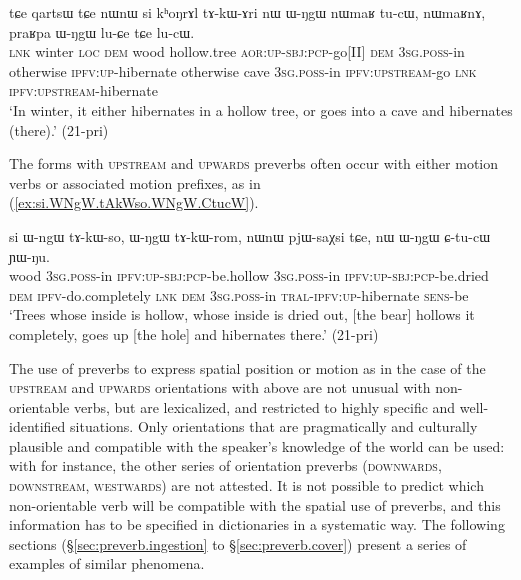 \begin{exe}
\ex \label{ex:praRpa.WNgW.lucW}
\gll tɕe qartsɯ tɕe nɯnɯ si kʰoŋrɤl tɤ-kɯ-ɤri nɯ ɯ-ŋgɯ nɯmaʁ tu-cɯ, 
nɯmaʁnɤ, praʁpa ɯ-ŋgɯ lu-ɕe tɕe lu-cɯ. \\
\textsc{lnk} winter \textsc{loc} \textsc{dem} wood hollow.tree \textsc{aor}:\textsc{up}-\textsc{sbj}:\textsc{pcp}-go[II] \textsc{dem} \textsc{3sg}.\textsc{poss}-in otherwise \textsc{ipfv}:\textsc{up}-hibernate otherwise cave \textsc{3sg}.\textsc{poss}-in \textsc{ipfv}:\textsc{upstream}-go \textsc{lnk} \textsc{ipfv}:\textsc{upstream}-hibernate \\
\glt `In winter, it either hibernates in a hollow tree, or goes into a cave and hibernates (there).' (21-pri)
\end{exe}


The forms with \textsc{upstream} and \textsc{upwards} preverbs often occur with either motion verbs or associated motion prefixes, as in (\ref{ex:si.WNgW.tAkWso.WNgW.CtucW}).

\begin{exe}
\ex \label{ex:si.WNgW.tAkWso.WNgW.CtucW}
\gll  si ɯ-ngɯ tɤ-kɯ-so, ɯ-ŋgɯ tɤ-kɯ-rom, nɯnɯ pjɯ-saχsi tɕe, nɯ ɯ-ŋgɯ ɕ-tu-cɯ ɲɯ-ŋu.\\
wood \textsc{3sg}.\textsc{poss}-in \textsc{ipfv}:\textsc{up}-\textsc{sbj}:\textsc{pcp}-be.hollow \textsc{3sg}.\textsc{poss}-in \textsc{ipfv}:\textsc{up}-\textsc{sbj}:\textsc{pcp}-be.dried \textsc{dem} \textsc{ipfv}-do.completely \textsc{lnk} \textsc{dem} \textsc{3sg}.\textsc{poss}-in \textsc{tral}-\textsc{ipfv}:\textsc{up}-hibernate \textsc{sens}-be \\
\glt `Trees whose inside is hollow, whose inside is dried out, [the bear] hollows it completely, goes up [the hole] and hibernates there.' (21-pri) 
\end{exe}

The use of preverbs to express spatial position or motion as in the case of the \textsc{upstream} and \textsc{upwards} orientations with  above are not unusual with non-orientable verbs, but are lexicalized, and restricted to highly specific and well-identified situations. Only orientations that are pragmatically and culturally plausible and compatible with the speaker's knowledge of the world can be used: with  for instance, the other series of  orientation preverbs (\textsc{downwards}, \textsc{downstream}, \textsc{westwards}) are not attested. It is not possible to predict which non-orientable verb will be compatible with the spatial use of preverbs, and this information has to be specified in dictionaries in a systematic way. The following sections (§\ref{sec:preverb.ingestion} to §\ref{sec:preverb.cover}) present a series of examples of similar phenomena.

